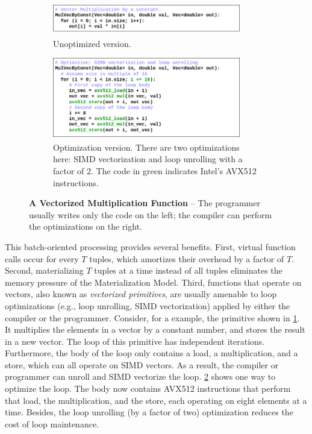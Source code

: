 \documentclass[12pt]{cmuthesis}
\begin{document}
\begin{figure}[t!]
\centering
\begin{subfigure}[t]{.5\textwidth}
 \centering
 \includegraphics[width=0.9\textwidth]{images/MulByConstSISD.png}
 \caption{Unoptimized version.}
  \label{fig:vector_mul_sisd}
\end{subfigure}%
\begin{subfigure}[t]{.5\textwidth}
 \centering
 \includegraphics[width=0.9\textwidth]{images/MulByConstSIMD.png}
 \caption{Optimization version. There are two optimizations here: SIMD vectorization and loop unrolling with a factor of 2. The code in green indicates Intel's AVX512 instructions.}
  \label{fig:vector_mul_simd}
\end{subfigure}
\caption{\textbf{A Vectorized Multiplication Function} -- The programmer usually writes only the code on the left; the compiler can perform the optimizations on the right.}
\label{fig:vector_mul}
\end{figure}


This batch-oriented processing provides several benefits. First, virtual function calls occur for every $T$ tuples, which amortizes their overhead by a factor of $T$. Second, materializing $T$ tuples at a time instead of all tuples eliminates the memory pressure of the Materialization Model. Third, functions that operate on vectors, also known as \textit{vectorized primitives}, are usually amenable to loop optimizations (e.g., loop unrolling, SIMD vectorization) applied by either the compiler or the programmer. Consider, for a example, the primitive shown in \cref{fig:vector_mul_sisd}. It multiplies the elements in a vector by a constant number, and stores the result in a new vector. The loop of this primitive has independent iterations. Furthermore, the body of the loop only contains a load, a multiplication, and a store, which can all operate on SIMD vectors. As a result, the compiler or programmer can unroll and SIMD vectorize the loop. \cref{fig:vector_mul_simd} shows one way to optimize the loop. The body now contains AVX512 instructions \cite{intel2019} that perform that load, the multiplication, and the store, each operating on eight elements at a time. Besides, the loop unrolling (by a factor of two) optimization reduces the cost of loop maintenance.
\end{document}
